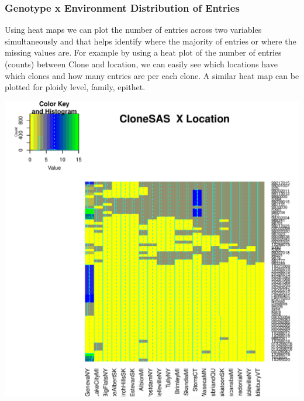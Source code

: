 \documentclass{article}\usepackage[]{graphicx}\usepackage[]{color}
\makeatletter
\def\maxwidth{ %
  \ifdim\Gin@nat@width>\linewidth
    \linewidth
  \else
    \Gin@nat@width
  \fi
}
\newenvironment{knitrout}{}{} %
\makeatother
\begin{document}
\subsubsection*{Genotype x Environment Distribution of Entries}

Using heat maps we can plot the number of entries across two variables simultaneously and that helps identify where the majority of entries or where the missing values are. For example by using a heat plot of the number of entries (counts) between Clone and location, we can easily see which locations have which clones and how many entries are per each clone.  A similar heat map can be plotted for ploidy level, family, epithet.

\begin{knitrout}
\color{fgcolor}

{\centering \includegraphics[width=\maxwidth]{figure/HeatmapCloneSASLocation-1} 

}





\end{knitrout}
\end{document}
